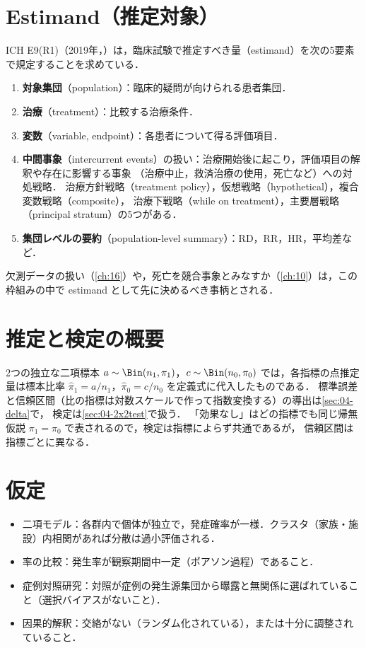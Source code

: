 \section{Estimand（推定対象）}\label{sec:02-estimand}
ICH E9(R1)（2019年，\cite{ich:e9r1}）は，臨床試験で推定すべき量（estimand）を次の5要素で規定することを求めている．
\begin{enumerate}
\item \textbf{対象集団}（population）：臨床的疑問が向けられる患者集団．
\item \textbf{治療}（treatment）：比較する治療条件．
\item \textbf{変数}（variable, endpoint）：各患者について得る評価項目．
\item \textbf{中間事象}（intercurrent events）の扱い：治療開始後に起こり，評価項目の解釈や存在に影響する事象
      （治療中止，救済治療の使用，死亡など）への対処戦略．
      治療方針戦略（treatment policy），仮想戦略（hypothetical），複合変数戦略（composite），
      治療下戦略（while on treatment），主要層戦略（principal stratum）の5つがある．
\item \textbf{集団レベルの要約}（population-level summary）：RD，RR，HR，平均差など．
\end{enumerate}
欠測データの扱い（\cref{ch:16}）や，死亡を競合事象とみなすか（\cref{ch:10}）は，この枠組みの中で estimand として先に決めるべき事柄とされる．

\section{推定と検定の概要}\label{sec:02-inference}
2つの独立な二項標本 $a\sim\Bin(n_1,\pi_1)$，$c\sim\Bin(n_0,\pi_0)$ では，各指標の点推定量は標本比率 $\hat\pi_1=a/n_1$，$\hat\pi_0=c/n_0$ を定義式に代入したものである．
標準誤差と信頼区間（比の指標は対数スケールで作って指数変換する）の導出は\cref{sec:04-delta}で，
検定は\cref{sec:04-2x2test}で扱う．
「効果なし」はどの指標でも同じ帰無仮説 $\pi_1=\pi_0$ で表されるので，検定は指標によらず共通であるが，
信頼区間は指標ごとに異なる．

\section{仮定}\label{sec:02-assump}
\begin{itemize}
\item 二項モデル：各群内で個体が独立で，発症確率が一様．クラスタ（家族・施設）内相関があれば分散は過小評価される．
\item 率の比較：発生率が観察期間中一定（ポアソン過程）であること．
\item 症例対照研究：対照が症例の発生源集団から曝露と無関係に選ばれていること（選択バイアスがないこと）．
\item 因果的解釈：交絡がない（ランダム化されている），または十分に調整されていること．
\end{itemize}

